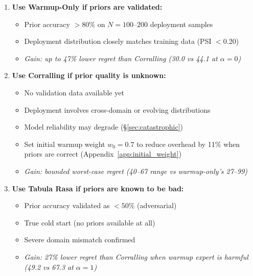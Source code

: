 \begin{enumerate}[nosep]
    \item \textbf{Use Warmup-Only if priors are validated:}
    \begin{itemize}[nosep]
        \item Prior accuracy ${>}80\%$ on $N{=}100$--$200$ deployment
              samples
        \item Deployment distribution closely matches training data
              (PSI $<$0.20)
        \item \emph{Gain: up to 47\% lower regret than Corralling
              (30.0 vs 44.1 at $\alpha{=}0$)}
    \end{itemize}

    \item \textbf{Use Corralling if prior quality is unknown:}
    \begin{itemize}[nosep]
        \item No validation data available yet
        \item Deployment involves cross-domain or evolving distributions
        \item Model reliability may degrade (\S\ref{sec:catastrophic})
        \item Set initial warmup weight $w_0{=}0.7$ to reduce
              overhead by 11\% when priors are correct
              (Appendix~\ref{app:initial_weight})
        \item \emph{Gain: bounded worst-case regret (40--67 range vs
              warmup-only's 27--99)}
    \end{itemize}

    \item \textbf{Use Tabula Rasa if priors are known to be bad:}
    \begin{itemize}[nosep]
        \item Prior accuracy validated as ${<}50\%$ (adversarial)
        \item True cold start (no priors available at all)
        \item Severe domain mismatch confirmed
        \item \emph{Gain: 27\% lower regret than Corralling when
              warmup expert is harmful (49.2 vs 67.3 at $\alpha{=}1$)}
    \end{itemize}
\end{enumerate}

